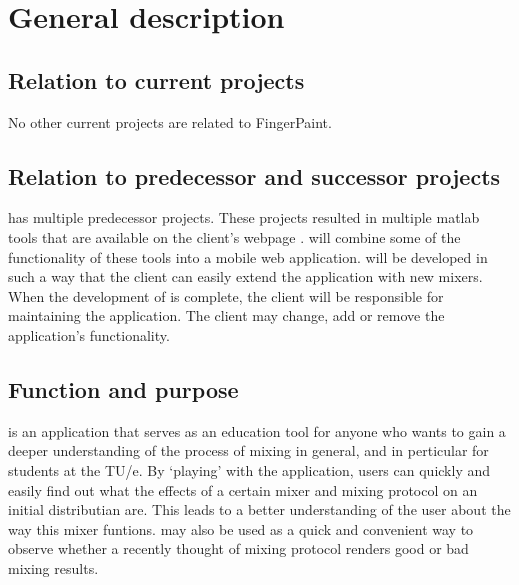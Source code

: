\chapter{General description}

\section{Relation to current projects}
No other current projects are related to FingerPaint.

\section{Relation to predecessor and successor projects}
\projectname has multiple predecessor projects. These projects resulted in multiple matlab tools that are available on the client's webpage \cite{clientpage}. \projectname will combine some of the functionality of these tools into a mobile web application. \projectname will be developed in such a way that the client can easily extend the application with new mixers. When the development of \projectname is complete, the client will be responsible for maintaining the application. The client may change, add or remove the application's functionality.

\section{Function and purpose}
\projectname is an application that serves as an education tool for anyone who wants to gain a deeper understanding of the process of mixing in general, and in perticular for students at the TU/e. By `playing' with the application, users can quickly and easily find out what the effects of a certain mixer and mixing protocol on an initial distributian are. This leads to a better understanding of the user about the way this mixer funtions. \projectname may also be used as a quick and convenient way to observe whether a recently thought of mixing protocol renders good or bad mixing results.

